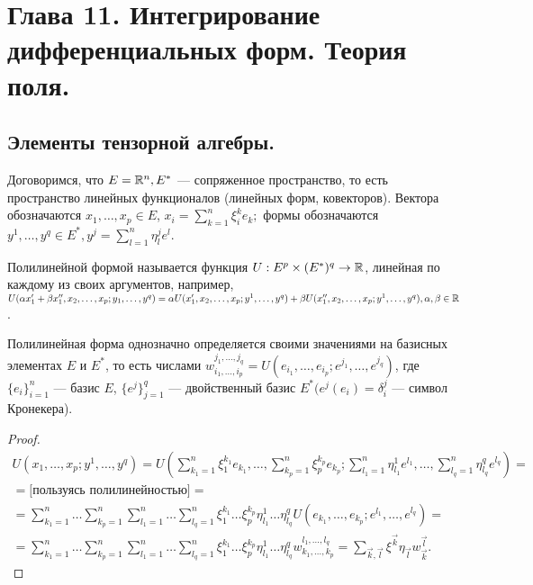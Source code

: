 \section{Глава 11. Интегрирование дифференциальных форм. Теория поля.}
\subsection{Элементы тензорной алгебры.}
Договоримся, что $E = \mathbb{R}^n, E^*$ --- сопряженное пространство, то есть пространство линейных функционалов (линейных форм, ковекторов). Вектора обозначаются $x_1, \ldots, x_p \in E$, $x_i=\sum\limits_{k=1}^n \xi_i^k e_k;$ формы обозначаются $y^1, \ldots, y^q\in E^*, y^j=\sum\limits_{l=1}^n \eta_l^j e^l$. 
\begin{Def}
	Полилинейной формой называется функция $U:E^p\times(E^*)^q\rightarrow \R$, линейная по каждому из своих аргументов, например, $U(\alpha x_1'+\beta x_1'', x_2, \ldots, x_p; y_1, \ldots, y^q)=\alpha U(x_1', x_2, \ldots, x_p;y^1, \ldots, y^q)+\beta U(x_1'', x_2, \ldots, x_p;y^1, \ldots, y^q), \alpha, \beta \in \R$.
\end{Def}
\begin{prop}
	Полилинейная форма однозначно определяется своими значениями на базисных элементах $E$ и $E^*$, то есть числами $w_{i_1, \ldots, i_p}^{j_1, \ldots, j_q} = U(e_{i_1}, \ldots, e_{i_p}; e^{j_1}, \ldots, e^{j_q})$, где $\{e_i\}_{i=1}^n$ --- базис $E$, $\{e^j\}_{j=1}^q$ --- двойственный базис $E^* (e^j(e_i)=\delta_i^j$ --- символ Кронекера).
\end{prop}
\begin{proof}
	\begin{multline*}
		U(x_1, \ldots, x_p; y^1, \ldots, y^q) = U(\sum\limits_{k_1=1}^n \xi_1^{k_1} e_{k_1}, \ldots, \sum\limits_{k_p=1}^n \xi_p^{k_p} e_{k_p}; \sum\limits_{l_1=1}^n \eta_{l_1}^1 e^{l_1}, \ldots, \sum\limits_{l_q=1}^n \eta_{l_q}^q e^{l_q})= \\ =
		\text{[пользуясь полилинейностью]} = \\ = \sum\limits_{k_1=1}^n \ldots \sum\limits_{k_p=1}^n\sum\limits_{l_1=1}^n\ldots\sum\limits_{l_q=1}^n \xi_1^{k_1}\ldots\xi_p^{k_p}\eta_{l_1}^1\ldots\eta_{l_q}^q U(e_{k_1}, \ldots, e_{k_p};e^{l_1}, \ldots, e^{l_q}) = \\ =
		\sum\limits_{k_1=1}^n \ldots \sum\limits_{k_p=1}^n\sum\limits_{l_1=1}^n\ldots\sum\limits_{l_q=1}^n \xi_1^{k_1}\ldots\xi_p^{k_p}\eta_{l_1}^1\ldots\eta_{l_q}^q w_{k_1, \ldots, k_p}^{l_1, \ldots, l_q} = \sum_{\overrightarrow{k}, \overrightarrow{l}}\xi^{\overrightarrow{k}}\eta_{\overrightarrow{l}}w_{\overrightarrow{k}}^{\overrightarrow{l}}.
	\end{multline*}
\end{proof}

